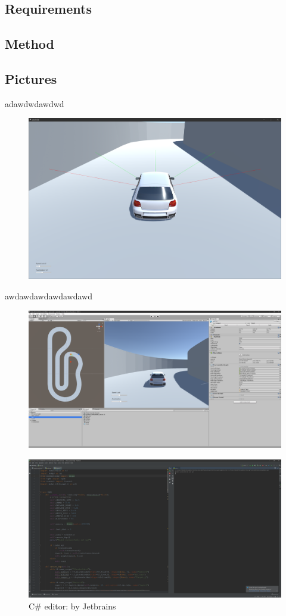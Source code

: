 \documentclass{article}
\begin{document}
\subsection{Requirements}
\subsection{Method}
\subsection{Pictures}
adawdwdawdwd
\begin{figure}
\includegraphics[width=\linewidth]{simulator}
\end{figure}
awdawdawdawdawdawd
\begin{figure}
\includegraphics[width=\linewidth]{unity}
\end{figure}

\begin{figure}
\includegraphics[width=\linewidth]{pycharm}
\caption{C\# editor:  by Jetbrains}
\end{figure}
\end{document}

